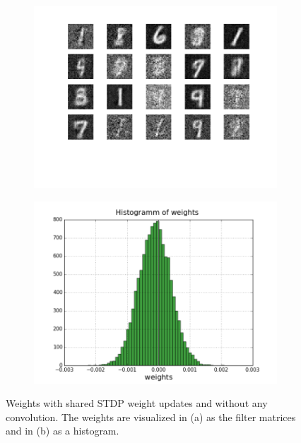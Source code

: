 \begin{figure}[h!]

	\begin{subfigure}[t]{.49\textwidth}
		\centering
		\includegraphics[width=.9\linewidth]{imgs/app/nest/ws.png}
		\caption{}
		\label{fig:sub12}
	\end{subfigure}
	\begin{subfigure}[t]{.49\textwidth}
  		\centering
  		\includegraphics[width=.9\linewidth]{imgs/app/nest/w_hist_normal.png}
  		\caption{}
  		\label{fig:sub2}
	\end{subfigure}
	\caption[Weights with shared STDP weight updates and without any convolution.]{Weights with shared STDP weight updates and without any convolution. The weights are visualized in (a) as the filter matrices and in (b) as a histogram. }
	\label{fig:nestwwout}
\end{figure}	


